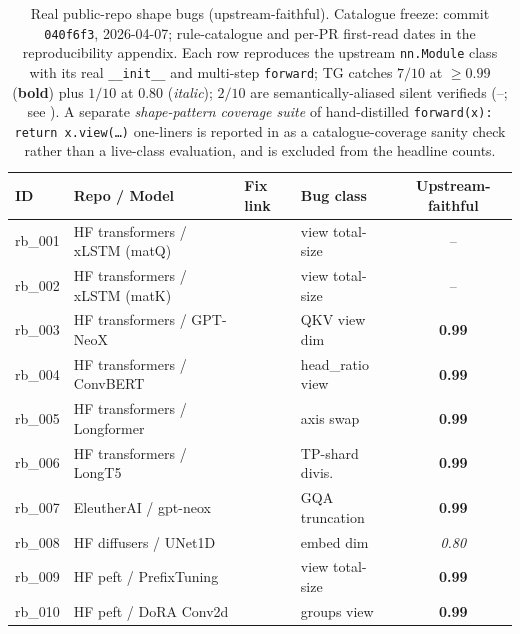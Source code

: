 \begin{table}[t]
\centering\small
\setlength{\tabcolsep}{4pt}
\caption{Real public-repo shape bugs (upstream-faithful). Catalogue
freeze: commit \texttt{040f6f3}, 2026-04-07; rule-catalogue and
per-PR first-read dates in the reproducibility appendix.
Each row reproduces the upstream \texttt{nn.Module} class with its
real \texttt{\_\_init\_\_} and multi-step \texttt{forward};
\textsc{TG} catches
$7/10$ at $\ge 0.99$ (\textbf{bold}) plus $1/10$ at $0.80$
(\textit{italic}); $2/10$ are semantically-aliased silent
verifieds (--; see ).
A separate \emph{shape-pattern coverage suite} of hand-distilled
\texttt{forward(x): return x.view(\ldots)} one-liners
 is reported in  as a catalogue-coverage sanity
check rather than a live-class evaluation, and is excluded from
the headline counts.}
\label{tab:real-bugs}
\begin{tabular}{l l l l c}
\toprule
ID & Repo / Model & Fix link & Bug class & Upstream-faithful \\
\midrule
rb\_001 & HF transformers / xLSTM (matQ) & & view total-size & -- \\
rb\_002 & HF transformers / xLSTM (matK) & & view total-size & -- \\
rb\_003 & HF transformers / GPT-NeoX & & QKV view dim & \textbf{0.99} \\
rb\_004 & HF transformers / ConvBERT & & head\_ratio view& \textbf{0.99} \\
rb\_005 & HF transformers / Longformer & & axis swap & \textbf{0.99} \\
rb\_006 & HF transformers / LongT5 & & TP-shard divis. & \textbf{0.99} \\
rb\_007 & EleutherAI / gpt-neox & & GQA truncation & \textbf{0.99} \\
rb\_008 & HF diffusers / UNet1D & & embed dim & \textit{0.80} \\
rb\_009 & HF peft / PrefixTuning & & view total-size & \textbf{0.99} \\
rb\_010 & HF peft / DoRA Conv2d & & groups view & \textbf{0.99} \\
\bottomrule
\end{tabular}
\end{table}

